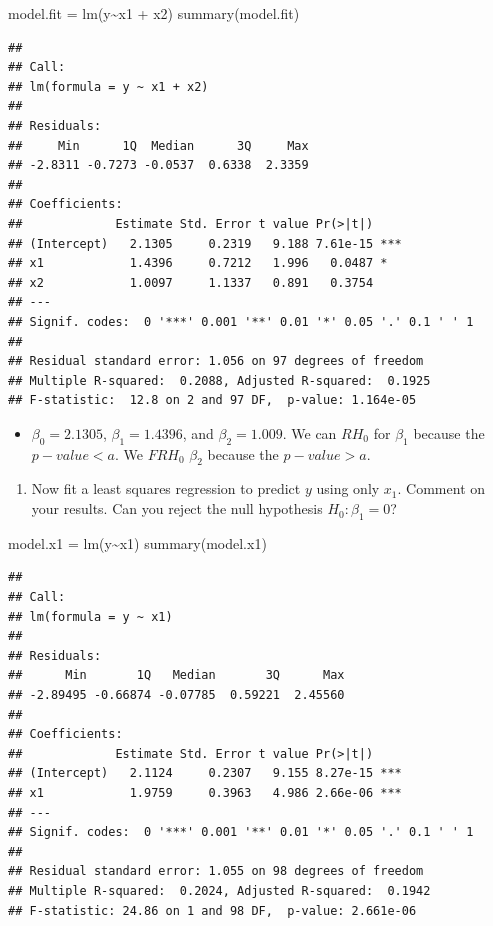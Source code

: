 \documentclass[
]{article}
\newenvironment{Shaded}{\begin{snugshade}}{\end{snugshade}}
\newcommand{\FunctionTok}[1]{\textcolor[rgb]{0.00,0.00,0.00}{#1}}
\newcommand{\NormalTok}[1]{#1}
\newcommand{\OtherTok}[1]{\textcolor[rgb]{0.56,0.35,0.01}{#1}}
\newcommand{\SpecialCharTok}[1]{\textcolor[rgb]{0.00,0.00,0.00}{#1}}
\providecommand{\tightlist}{%
  \setlength{\itemsep}{0pt}\setlength{\parskip}{0pt}}
\begin{document}
\begin{Shaded}
\begin{Highlighting}[]
\NormalTok{model.fit }\OtherTok{=} \FunctionTok{lm}\NormalTok{(y}\SpecialCharTok{\textasciitilde{}}\NormalTok{x1 }\SpecialCharTok{+}\NormalTok{ x2)}
\FunctionTok{summary}\NormalTok{(model.fit)}
\end{Highlighting}
\end{Shaded}

\begin{verbatim}
## 
## Call:
## lm(formula = y ~ x1 + x2)
## 
## Residuals:
##     Min      1Q  Median      3Q     Max 
## -2.8311 -0.7273 -0.0537  0.6338  2.3359 
## 
## Coefficients:
##             Estimate Std. Error t value Pr(>|t|)    
## (Intercept)   2.1305     0.2319   9.188 7.61e-15 ***
## x1            1.4396     0.7212   1.996   0.0487 *  
## x2            1.0097     1.1337   0.891   0.3754    
## ---
## Signif. codes:  0 '***' 0.001 '**' 0.01 '*' 0.05 '.' 0.1 ' ' 1
## 
## Residual standard error: 1.056 on 97 degrees of freedom
## Multiple R-squared:  0.2088, Adjusted R-squared:  0.1925 
## F-statistic:  12.8 on 2 and 97 DF,  p-value: 1.164e-05
\end{verbatim}

\begin{itemize}
\tightlist
\item
  \(\beta_0 = 2.1305\), \(\beta_1 = 1.4396\), and \(\beta_2 = 1.009\).
  We can \(RH_0\) for \(\beta_1\) because the \(p-value < a\). We
  \(FRH_0\) \(\beta_2\) because the \(p-value > a\).\\
\end{itemize}

\begin{enumerate}
\def\labelenumi{(\alph{enumi})}
\setcounter{enumi}{3}
\tightlist
\item
  Now fit a least squares regression to predict \(y\) using only
  \(x_1\). Comment on your results. Can you reject the null hypothesis
  \(H_0 : \beta_1 = 0\)?
\end{enumerate}

\begin{Shaded}
\begin{Highlighting}[]
\NormalTok{model.x1 }\OtherTok{=} \FunctionTok{lm}\NormalTok{(y}\SpecialCharTok{\textasciitilde{}}\NormalTok{x1)}
\FunctionTok{summary}\NormalTok{(model.x1)}
\end{Highlighting}
\end{Shaded}

\begin{verbatim}
## 
## Call:
## lm(formula = y ~ x1)
## 
## Residuals:
##      Min       1Q   Median       3Q      Max 
## -2.89495 -0.66874 -0.07785  0.59221  2.45560 
## 
## Coefficients:
##             Estimate Std. Error t value Pr(>|t|)    
## (Intercept)   2.1124     0.2307   9.155 8.27e-15 ***
## x1            1.9759     0.3963   4.986 2.66e-06 ***
## ---
## Signif. codes:  0 '***' 0.001 '**' 0.01 '*' 0.05 '.' 0.1 ' ' 1
## 
## Residual standard error: 1.055 on 98 degrees of freedom
## Multiple R-squared:  0.2024, Adjusted R-squared:  0.1942 
## F-statistic: 24.86 on 1 and 98 DF,  p-value: 2.661e-06
\end{verbatim}
\end{document}
